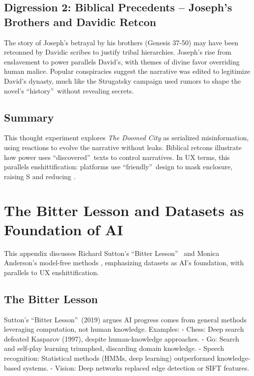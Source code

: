 \documentclass[openany]{book}
\newcommand{\Sent}{S} %
\newcommand{\Auton}{\mathcal{A}} %
\begin{document}
\section{Digression 2: Biblical Precedents – Joseph's Brothers and Davidic Retcon}
The story of Joseph's betrayal by his brothers (Genesis 37-50) may have been retconned by Davidic scribes to justify tribal hierarchies. Joseph's rise from enslavement to power parallels David's, with themes of divine favor overriding human malice. Popular conspiracies suggest the narrative was edited to legitimize David's dynasty, much like the Strugatsky campaign used rumors to shape the novel's \textquotedblleft history\textquotedblright\ without revealing secrets.

\section{Summary}
This thought experiment explores \emph{The Doomed City} as serialized misinformation, using reactions to evolve the narrative without leaks. Biblical retcons illustrate how power uses \textquotedblleft discovered\textquotedblright\ texts to control narratives. In UX terms, this parallels enshittification: platforms use \textquotedblleft friendly\textquotedblright\ design to mask enclosure, raising \Sent{} and reducing \Auton{}.

\chapter{The Bitter Lesson and Datasets as Foundation of AI}
\label{app:bitter-lesson}

This appendix discusses Richard Sutton's \textquotedblleft Bitter Lesson\textquotedblright\ \citep{sutton2019} and Monica Anderson's model-free methods \citep{anderson2014}, emphasizing datasets as AI's foundation, with parallels to UX enshittification.

\section{The Bitter Lesson}
\label{sec:bitter-lesson}
Sutton's \textquotedblleft Bitter Lesson\textquotedblright\ (2019) argues AI progress comes from general methods leveraging computation, not human knowledge. Examples:
- Chess: Deep search defeated Kasparov (1997), despite human-knowledge approaches.
- Go: Search and self-play learning triumphed, discarding domain knowledge.
- Speech recognition: Statistical methods (HMMs, deep learning) outperformed knowledge-based systems.
- Vision: Deep networks replaced edge detection or SIFT features.
\end{document}
